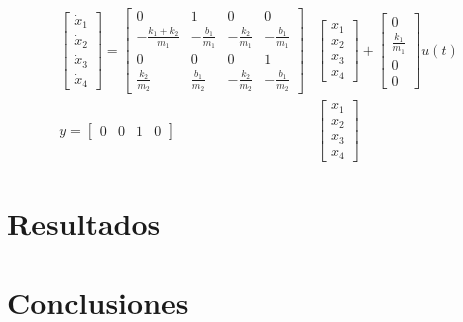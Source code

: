 \documentclass{article}
\begin{document}
\begin{enumerate}
  \begin{align}
    \begin{bmatrix}
      \dot{x}_1 \\ \dot{x}_2 \\ \dot{x}_3 \\ \dot{x}_4
    \end{bmatrix} =
    \begin{bmatrix}
      0 & 1 & 0 & 0\\
      -\frac{k_1+k_2}{m_1} & -\frac{b_1}{m_1} & -\frac{k_2}{m_1} & -\frac{b_1}{m_1}\\
      0 & 0 & 0 & 1\\
      \frac{k_2}{m_2} & \frac{b_1}{m_2} & -\frac{k_2}{m_2} & -\frac{b_1}{m_2}
    \end{bmatrix}&
    \begin{bmatrix}
      x_1 \\ x_2 \\ x_3 \\ x_4
    \end{bmatrix} + 
    \begin{bmatrix}
      0 \\ \frac{k_1}{m_1} \\ 0 \\ 0
    \end{bmatrix}
    u(t)\\
    y =
    \begin{bmatrix}
      0 & 0 & 1 & 0
    \end{bmatrix}&
    \begin{bmatrix}
      x_1 \\ x_2 \\ x_3 \\ x_4
    \end{bmatrix}
  \end{align}
\end{enumerate}


\section{Resultados}
\lipsum[1-3] \cite{sternberg2010dynamical}

\section{Conclusiones}
\lipsum[1-2] \cite{chatterjee2021covid}

\printbibliography[heading=bibintoc]
\end{document}
